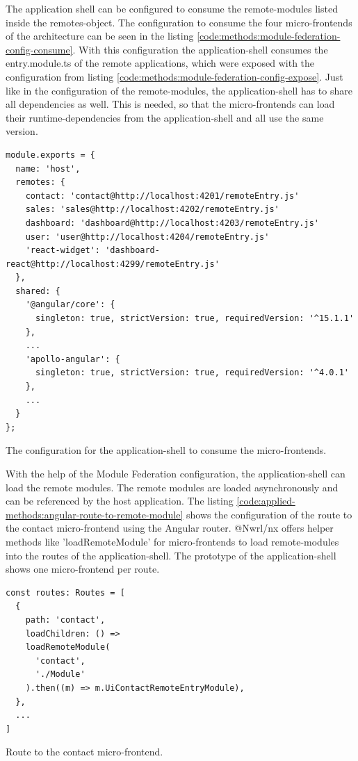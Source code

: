 
\noindent The application shell can be configured to consume the remote-modules listed inside the remotes-object. The configuration to consume the four micro-frontends of the architecture can be seen in the listing \ref{code:methods:module-federation-config-consume}. With this configuration the application-shell consumes the entry.module.ts of the remote applications, which were exposed with the configuration from listing \ref{code:methods:module-federation-config-expose}. Just like in the configuration of the remote-modules, the application-shell has to share all dependencies as well. This is needed, so that the micro-frontends can load their runtime-dependencies from the application-shell and all use the same version.

\ifshowListings
\begin{listing}[H]
    \begin{verbatim}
module.exports = {
  name: 'host',
  remotes: {
    contact: 'contact@http://localhost:4201/remoteEntry.js'
    sales: 'sales@http://localhost:4202/remoteEntry.js'
    dashboard: 'dashboard@http://localhost:4203/remoteEntry.js'
    user: 'user@http://localhost:4204/remoteEntry.js'
    'react-widget': 'dashboard-react@http://localhost:4299/remoteEntry.js'
  },
  shared: {
    '@angular/core': {
      singleton: true, strictVersion: true, requiredVersion: '^15.1.1' 
    },
    ...
    'apollo-angular': { 
      singleton: true, strictVersion: true, requiredVersion: '^4.0.1' 
    },
    ...
  }
};
    \end{verbatim}
    \caption{The configuration for the application-shell to consume the micro-frontends.}\label{code:applied-methods:module-federation-config-consume}
\end{listing}
\fi

\noindent With the help of the Module Federation configuration, the application-shell can load the remote modules. The remote modules are loaded asynchronously and can be referenced by the host application. The listing \ref{code:applied-methods:angular-route-to-remote-module} shows the configuration of the route to the contact micro-frontend using the Angular router. @Nwrl/nx offers helper methods like 'loadRemoteModule' for micro-frontends to load remote-modules into the routes of the application-shell. The prototype of the application-shell shows one micro-frontend per route.

\ifshowListings
\begin{listing}[H]
    \begin{verbatim}
const routes: Routes = [
  {
    path: 'contact',
    loadChildren: () =>
    loadRemoteModule(
      'contact',
      './Module'
    ).then((m) => m.UiContactRemoteEntryModule),
  },
  ...
]
    \end{verbatim}
    \caption{Route to the contact micro-frontend.}\label{code:applied-methods:angular-route-to-remote-module}
\end{listing}
\fi

